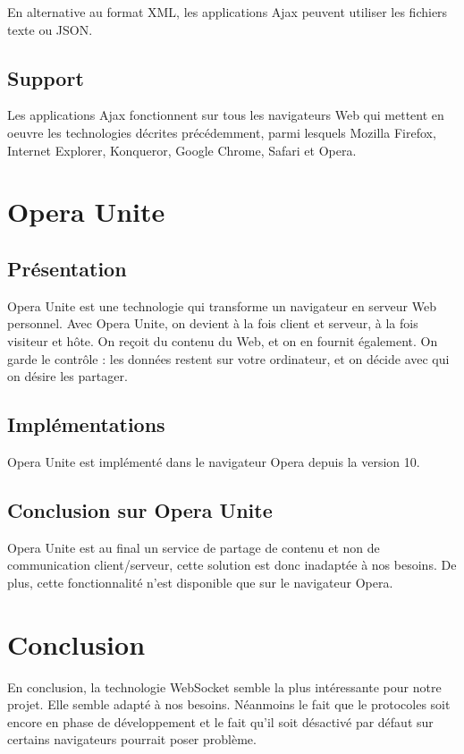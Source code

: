 \documentclass[a4paper,10pt]{report}
\begin{document}
En alternative au format XML, les applications Ajax peuvent utiliser les fichiers texte ou JSON.

  \subsection{Support}

Les applications Ajax fonctionnent sur tous les navigateurs Web qui mettent en oeuvre les 
technologies décrites précédemment, parmi lesquels Mozilla Firefox, Internet Explorer, 
Konqueror, Google Chrome, Safari et Opera.


  \section{Opera Unite}

    \subsection{Présentation}

Opera Unite est une technologie qui transforme un navigateur en serveur 
Web personnel. Avec Opera Unite, on devient à la fois client et serveur, 
à la fois visiteur et hôte. On reçoit du contenu du Web, et on en fournit 
également. On garde le contrôle : les données restent sur votre ordinateur, 
et on décide avec qui on désire les partager. 

    \subsection{Implémentations}

Opera Unite est implémenté dans le navigateur Opera depuis la version 10.


    \subsection{Conclusion sur Opera Unite}

Opera Unite est au final un service de partage de contenu et non de 
communication client/serveur, cette solution est donc inadaptée à nos 
besoins. De plus, cette fonctionnalité n'est disponible que sur le 
navigateur Opera.

  \section{Conclusion}

En conclusion, la technologie WebSocket semble la plus intéressante pour notre projet.
Elle semble adapté à nos besoins. Néanmoins le fait que le protocoles soit 
encore en phase de développement et le fait qu'il soit désactivé par défaut 
sur certains navigateurs pourrait poser problème.
\end{document}
